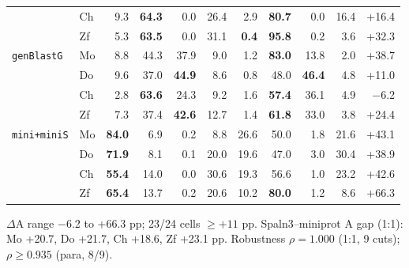\begin{table}[!t]
\begin{tabular}{llrrrrrrrrr}
 & Ch & 9.3 & \textbf{64.3} & 0.0 & 26.4 & 2.9 & \textbf{80.7} & 0.0 & 16.4 & +16.4 \\
 & Zf & 5.3 & \textbf{63.5} & 0.0 & 31.1 & \textbf{0.4} & \textbf{95.8} & 0.2 & 3.6 & +32.3 \\
\midrule
\texttt{genBlastG} & Mo & 8.8 & 44.3 & 37.9 & 9.0 & 1.2 & \textbf{83.0} & 13.8 & 2.0 & +38.7 \\
 & Do & 9.6 & 37.0 & \textbf{44.9} & 8.6 & 0.8 & 48.0 & \textbf{46.4} & 4.8 & +11.0 \\
 & Ch & 2.8 & \textbf{63.6} & 24.3 & 9.2 & 1.6 & \textbf{57.4} & 36.1 & 4.9 & $-$6.2 \\
 & Zf & 7.3 & 37.4 & \textbf{42.6} & 12.7 & 1.4 & \textbf{61.8} & 33.0 & 3.8 & +24.4 \\
\midrule
\texttt{mini+miniS} & Mo & \textbf{84.0} & 6.9 & 0.2 & 8.8 & 26.6 & 50.0 & 1.8 & 21.6 & +43.1 \\
 & Do & \textbf{71.9} & 8.1 & 0.1 & 20.0 & 19.6 & 47.0 & 3.0 & 30.4 & +38.9 \\
 & Ch & \textbf{55.4} & 14.0 & 0.0 & 30.6 & 19.3 & 56.6 & 1.0 & 23.2 & +42.6 \\
 & Zf & \textbf{65.4} & 13.7 & 0.2 & 20.6 & 10.2 & \textbf{80.0} & 1.2 & 8.6 & +66.3 \\
\bottomrule
\end{tabular}

\vspace{2pt}
\footnotesize $\Delta$A range $-$6.2 to +66.3 pp; 23/24 cells $\ge +11$ pp. Spaln3--miniprot A gap (1:1): Mo +20.7, Do +21.7, Ch +18.6, Zf +23.1 pp. Robustness $\rho = 1.000$ (1:1, 9 cuts); $\rho \ge 0.935$ (para, 8/9).
\end{table}
